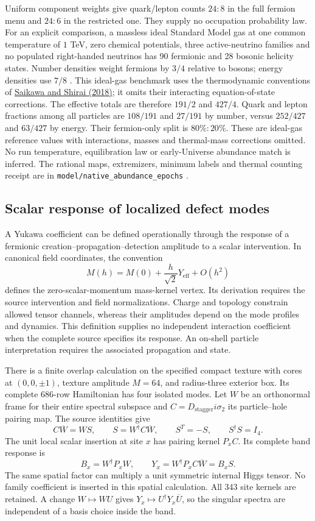 Uniform component weights give quark/lepton counts $24:8$ in the full
fermion menu and $24:6$ in the restricted one. They supply no occupation
probability law. For an explicit comparison, a massless ideal Standard
Model gas at one common temperature of $1$ TeV, zero chemical potentials,
three active-neutrino families and no populated right-handed neutrinos has
90 fermionic and 28 bosonic helicity states. Number densities weight
fermions by $3/4$ relative to bosons; energy densities use $7/8$
\cite{pwnavas2024review}. This ideal-gas benchmark uses the thermodynamic
conventions of \href{https://doi.org/10.1088/1475-7516/2018/05/035}{Saikawa and Shirai (2018)};
it omits their interacting equation-of-state corrections.
The effective totals are therefore $191/2$ and
$427/4$. Quark and lepton fractions among all particles are $108/191$ and
$27/191$ by number, versus $252/427$ and $63/427$ by energy. Their
fermion-only split is $80\%:20\%$. These are ideal-gas reference values
with interactions, masses and thermal-mass corrections omitted. No run
temperature, equilibration law or early-Universe abundance match is
inferred. The rational maps, extremizers, minimum labels and thermal
counting receipt are in \texttt{model/native\_abundance\_epochs} \cite{ophrepo}.

\subsection{Scalar response of localized defect modes}
\label{sec:defect-scalar-overlap}

A Yukawa coefficient can be defined operationally through the response of
a fermionic creation--propagation--detection amplitude to a scalar
intervention. In canonical field coordinates, the convention
\[
 M(h)=M(0)+\frac{h}{\sqrt2}Y_{\mathrm{eff}}+O(h^2)
\]
defines the zero-scalar-momentum mass-kernel vertex. Its derivation requires
the source intervention and field normalizations. Charge and topology
constrain allowed tensor channels, whereas their amplitudes depend on the
mode profiles and dynamics. This definition supplies no independent
interaction coefficient when the complete source specifies its
response. An on-shell particle interpretation requires the associated
propagation and state.

There is a finite overlap calculation on the specified compact texture
with cores at $(0,0,\pm1)$, texture amplitude $M=64$, and radius-three
exterior box. Its complete 686-row Hamiltonian has four isolated modes.
Let $W$ be an orthonormal frame for their entire spectral subspace and
$C=D_{\mathrm{stagger}}i\sigma_2$ its particle--hole pairing map. The
source identities give
\[
 C\overline W=WS,\qquad
 S=W^\dagger C\overline W,\qquad S^T=-S,
 \qquad S^\dagger S=I_4.
\]
The unit local scalar insertion at site $x$ has pairing kernel $P_xC$.
Its complete band response is
\[
 B_x=W^\dagger P_xW,\qquad
 Y_x=W^\dagger P_xC\overline W=B_xS.
\]
The same spatial factor can multiply a unit symmetric internal Higgs
tensor. No family coefficient is inserted in this spatial calculation.
All 343 site kernels are retained. A change $W\mapsto WU$ gives
$Y_x\mapsto U^\dagger Y_x\overline U$, so the singular spectra are
independent of a basis choice inside the band.

